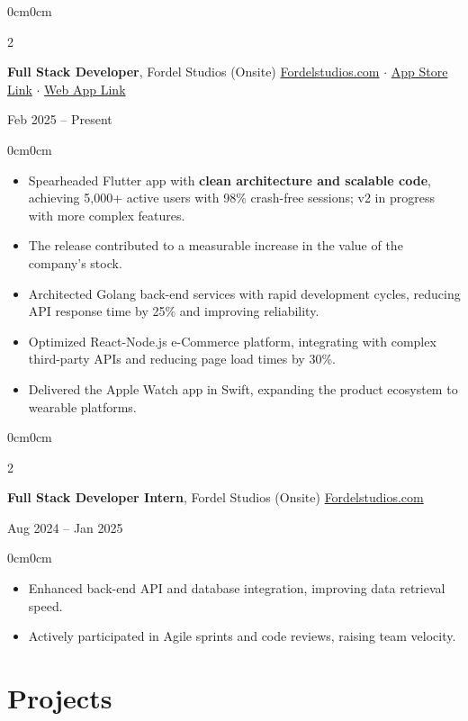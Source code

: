 \documentclass[10pt, letterpaper]{article}
\newenvironment{highlights}{
    \begin{itemize}[topsep=0pt, parsep=0.3pt, itemsep=0pt, leftmargin=10pt]
}{
    \end{itemize}
}
\newenvironment{onecolentry}{\begin{adjustwidth}{0cm}{0cm}}{\end{adjustwidth}}
\newenvironment{twocolentry}[2][]{
    \onecolentry
    \def\secondColumn{#2}
    \setcolumnwidth{\fill, 4.2cm}
    \begin{paracol}{2}
}{
    \switchcolumn \raggedleft \secondColumn
    \end{paracol}
    \endonecolentry
}
\begin{document}
\begin{twocolentry}{Feb 2025 – Present}
    \textbf{Full Stack Developer}, Fordel Studios (Onsite) 
    \href{https://Fordelstudios.com/}{Fordelstudios.com} $\cdot$
    \href{https://apps.apple.com/in/app/emsigner-sign-electronically/id1246670687?platform=appleWatch}{App Store Link} $\cdot$
    \href{https://formula.yellowchalk.dev/}{Web App Link}
\end{twocolentry}
\begin{onecolentry}
    \begin{highlights}
        \item Spearheaded Flutter app with \textbf{clean architecture and scalable code}, achieving 5,000+ active users with 98\% crash-free sessions; v2 in progress with more complex features. 
        \item The release contributed to a measurable increase in the value of the company's stock.
        \item Architected Golang back-end services with rapid development cycles, reducing API response time by 25\% and improving reliability.
        \item Optimized React-Node.js e-Commerce platform, integrating with complex third-party APIs and reducing page load times by 30\%.
        \item Delivered the Apple Watch app in Swift, expanding the product ecosystem to wearable platforms.
    \end{highlights}
\end{onecolentry}


\begin{twocolentry}{Aug 2024 – Jan 2025}
    \textbf{Full Stack Developer Intern}, Fordel Studios (Onsite) \href{https://Fordelstudios.com/}{Fordelstudios.com}
\end{twocolentry}
\begin{onecolentry}
    \begin{highlights}
        \item Enhanced back-end API and database integration, improving data retrieval speed.
        \item Actively participated in Agile sprints and code reviews, raising team velocity.
    \end{highlights}
\end{onecolentry}

\vspace{-0.1cm}
\section{Projects}
\end{document}
